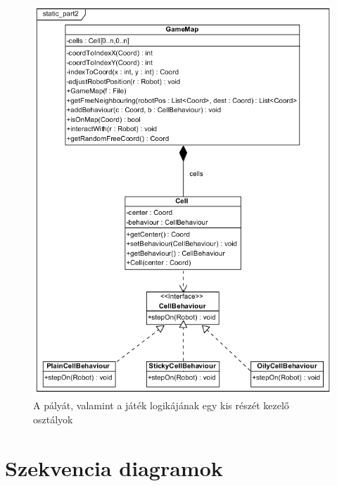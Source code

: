 \begin{figure}[!htbp]
\begin{center}
	\includegraphics[width=130mm, center]{./chapters/chapter03/static2.png}
	\caption{A pályát, valamint a játék logikájának egy kis részét kezelő osztályok}
\end{center}
\end{figure}

\clearpage

\section{Szekvencia diagramok}

